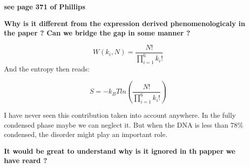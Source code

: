 \documentclass{article}
\begin{document}
\textbf{see page 371 of Phillips}

\textbf{Why is it different from the expression derived phenomenologicaly in the paper ? Can we bridge the gap in some manner ?}

\begin{equation}
    W({k_i},N) = \frac{N!}{\prod_{i=1}^6 k_i!}
\end{equation}
And the entropy then reads:

\begin{equation}
     S = - k_B T ln \left( \frac{N!}{\prod_{i=1}^6 k_i!} \right)
\end{equation}

I have never seen this contribution taken into account anywhere. In the fully condensed phase maybe we can neglect it. But when the DNA is less than 78\% condensed, the disorder might play an important role.

\textbf{It would be great to understand why is it ignored in th papper we have reard ?}




\printbibliography[
    heading=bibintoc,
    title={References} ]
\end{document}
